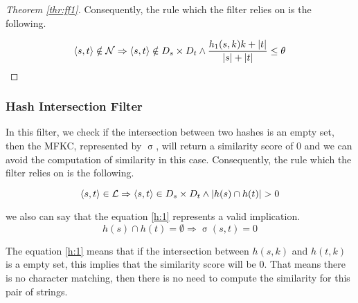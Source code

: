 \begin{proof}[Theorem \ref{thr:ff1}]


Consequently, the rule which the filter relies on is the following.

\begin{equation}
	\langle s,t \rangle \notin \mathcal{N} \Rightarrow \langle s,t \rangle \notin {\ensuremath{D_s}}{} \times {\ensuremath{D_t}}{} \wedge \frac{h_1(s,k) k + |t|}{|s|+|t|} \leq \theta 
\end{equation}
\end{proof}

\subsubsection{Hash Intersection Filter} \label{hashintfilter}
In this filter, we check if the intersection between two hashes is an empty set, then the MFKC, represented by $\upsigma$, will return a similarity score of 0 and we can avoid the computation of similarity in this case.
Consequently, the rule which the filter relies on is the following.

\begin{equation}
	\langle s,t \rangle \in \mathcal{L} \Rightarrow \langle s,t \rangle \in {\ensuremath{D_s}}{} \times {\ensuremath{D_t}}{} \wedge |h(s) \cap h(t)| > 0
\end{equation}

we also can say that the equation \ref{h:1} represents a valid implication.
\begin{equation} \label{h:1}
	h(s) \cap h(t) = \emptyset \Rightarrow \upsigma(s,t)=0
\end{equation}

The equation \ref{h:1} means that if the intersection between $h(s,k)$ and $h(t,k)$ is a empty set, this implies that the similarity score will be 0.
That means there is no character matching, then there is no need to compute the similarity for this pair of strings.

